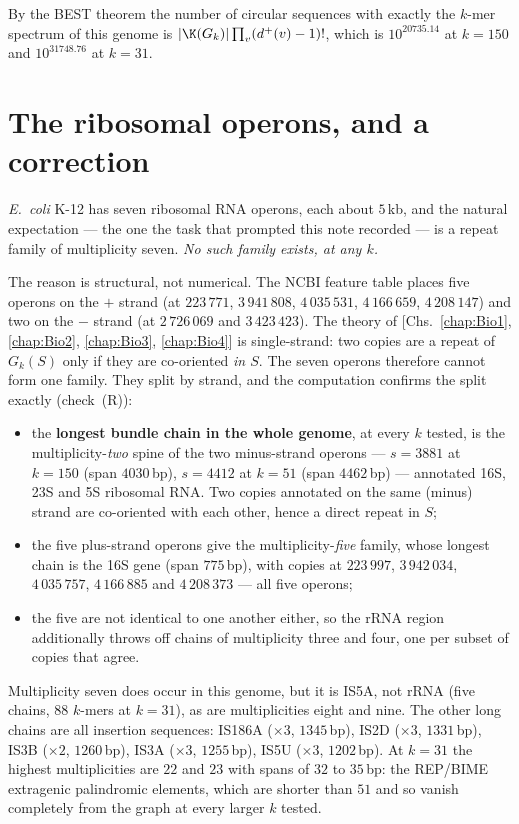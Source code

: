 By the BEST theorem the number of circular sequences with exactly the $k$-mer spectrum of
this genome is $|\K(G_k)|\prod_v(d^{+}(v)-1)!$, which is $10^{20735.14}$ at $k=150$ and
$10^{31748.76}$ at $k=31$.

\section{The ribosomal operons, and a correction}\label{Bio5:sec:rrna}

\emph{E.\ coli} K-12 has seven ribosomal RNA operons, each about $5$\,kb, and the natural
expectation --- the one the task that prompted this note recorded --- is a repeat family
of multiplicity seven. \emph{No such family exists, at any $k$.}

The reason is structural, not numerical. The NCBI feature table places five operons on
the $+$ strand (at $223\,771$, $3\,941\,808$, $4\,035\,531$, $4\,166\,659$, $4\,208\,147$)
and two on the $-$ strand (at $2\,726\,069$ and $3\,423\,423$). The theory of
[Chs.~\ref{chap:Bio1}, \ref{chap:Bio2}, \ref{chap:Bio3}, \ref{chap:Bio4}] is single-strand: two copies are a repeat of $G_k(S)$ only if
they are co-oriented \emph{in $S$}. The seven operons therefore cannot form one family.
They split by strand, and the computation confirms the split exactly (check~(R)):

\begin{itemize}
\item the \textbf{longest bundle chain in the whole genome}, at every $k$ tested, is the
multiplicity-\emph{two} spine of the two minus-strand operons --- $s=3881$ at $k=150$
(span $4030$\,bp), $s=4412$ at $k=51$ (span $4462$\,bp) --- annotated 16S, 23S and 5S
ribosomal RNA. Two copies annotated on the same (minus) strand are co-oriented with each
other, hence a direct repeat in $S$;
\item the five plus-strand operons give the multiplicity-\emph{five} family, whose longest
chain is the 16S gene (span $775$\,bp), with copies at $223\,997$, $3\,942\,034$,
$4\,035\,757$, $4\,166\,885$ and $4\,208\,373$ --- all five operons;
\item the five are not identical to one another either, so the rRNA region additionally
throws off chains of multiplicity three and four, one per subset of copies that agree.
\end{itemize}

Multiplicity seven does occur in this genome, but it is IS5A, not rRNA (five chains,
$88$ $k$-mers at $k=31$), as are multiplicities eight and nine. The other long chains are
all insertion sequences: IS186A ($\times3$, $1345$\,bp), IS2D ($\times3$, $1331$\,bp),
IS3B ($\times2$, $1260$\,bp), IS3A ($\times3$, $1255$\,bp), IS5U ($\times3$, $1202$\,bp).
At $k=31$ the highest multiplicities are $22$ and $23$ with spans of $32$ to $35$\,bp:
the REP/BIME extragenic palindromic elements, which are shorter than $51$ and so vanish
completely from the graph at every larger $k$ tested.


